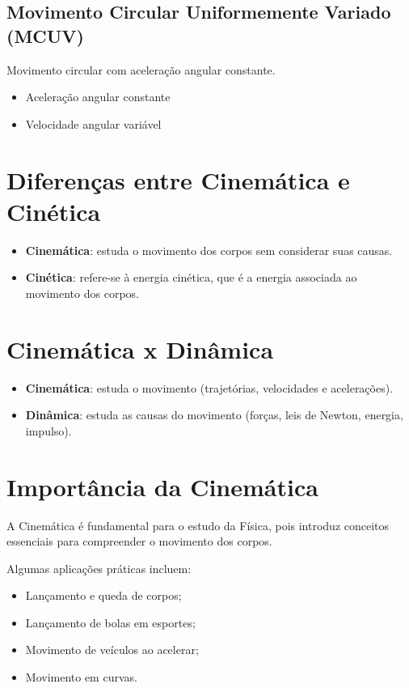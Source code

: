 \documentclass[a4paper,12pt]{article}
\begin{document}
\subsection{Movimento Circular Uniformemente Variado (MCUV)}

Movimento circular com aceleração angular constante.

\begin{itemize}
    \item Aceleração angular constante
    \item Velocidade angular variável
\end{itemize}

\section{Diferenças entre Cinemática e Cinética}

\begin{itemize}
    \item \textbf{Cinemática}: estuda o movimento dos corpos sem considerar suas causas.
    \item \textbf{Cinética}: refere-se à energia cinética, que é a energia associada ao movimento dos corpos.
\end{itemize}

\section{Cinemática x Dinâmica}

\begin{itemize}
    \item \textbf{Cinemática}: estuda o movimento (trajetórias, velocidades e acelerações).
    \item \textbf{Dinâmica}: estuda as causas do movimento (forças, leis de Newton, energia, impulso).
\end{itemize}

\section{Importância da Cinemática}

A Cinemática é fundamental para o estudo da Física, pois introduz conceitos essenciais para compreender o movimento dos corpos.

Algumas aplicações práticas incluem:

\begin{itemize}
    \item Lançamento e queda de corpos;
    \item Lançamento de bolas em esportes;
    \item Movimento de veículos ao acelerar;
    \item Movimento em curvas.
\end{itemize}
\end{document}
